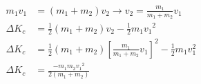 \documentclass[varwidth=true]{standalone}
\begin{document}
    \(\begin{aligned}
    m_1 v_1 &= (m_1 + m_2) v_2 \rightarrow v_2 = \frac{m_1}{m_1 + m_2} v_1\\
    \Delta K_c &= \frac{1}{2}(m_1 + m_2)v_2 - \frac{1}{2}m_1 {v_1}^2\\
    \Delta K_c &= \frac{1}{2}(m_1 + m_2){\left[\frac{m_1}{m_1 + m_2} v_1\right]}^2 - \frac{1}{2}m_1 v_1^2\\
    \Delta K_c &= \frac{-m_1 m_2 {v_1}^2}{2\left(m_1 + m_2\right)}
    \end{aligned}\)\\
\end{document}
